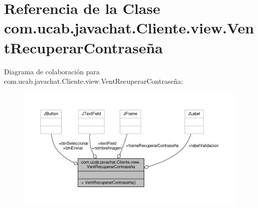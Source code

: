 \hypertarget{classcom_1_1ucab_1_1javachat_1_1_cliente_1_1view_1_1_vent_recuperar_contrase_xC3_xB1a}{\section{Referencia de la Clase com.\-ucab.\-javachat.\-Cliente.\-view.\-Vent\-Recuperar\-Contraseña}
\label{classcom_1_1ucab_1_1javachat_1_1_cliente_1_1view_1_1_vent_recuperar_contrase_xC3_xB1a}
}


Diagrama de colaboración para com.\-ucab.\-javachat.\-Cliente.\-view.\-Vent\-Recuperar\-Contraseña\-:
\nopagebreak
\begin{figure}[H]
\begin{center}
\leavevmode
\includegraphics[width=350pt]{d1/dfc/classcom_1_1ucab_1_1javachat_1_1_cliente_1_1view_1_1_vent_recuperar_contrase_xC3_xB1a__coll__graph}
\end{center}
\end{figure}
